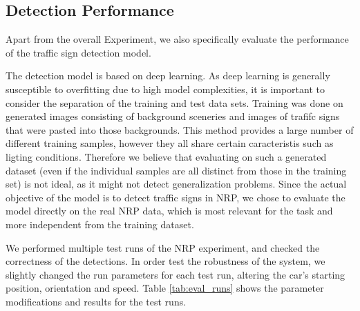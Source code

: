 \subsection{Detection Performance}
Apart from the overall Experiment, we also specifically evaluate the performance of the traffic sign detection model.

The detection model is based on deep learning. 
As deep learning is generally susceptible to overfitting due to high model complexities, it is important to consider the separation of the training and test data sets. 
Training was done on generated images consisting of background sceneries and images of trafifc signs that were pasted into those backgrounds. 
This method provides a large number of different training samples, however they all share certain caracteristis such as ligting conditions. 
Therefore we believe that evaluating on such a generated dataset (even if the individual samples are all distinct from those in the training set) is not ideal, as it might not detect generalization problems.
Since the actual objective of the model is to detect traffic signs in NRP, we chose to evaluate the model directly on the real NRP data, which is most relevant for the task and more independent from the training dataset.

We performed multiple test runs of the NRP experiment, and checked the correctness of the detections. In order test the robustness of the system, we slightly changed the run parameters for each test run, altering the car's starting position, orientation and speed. Table \ref{tab:eval_runs} shows the parameter modifications and results for the test runs.

